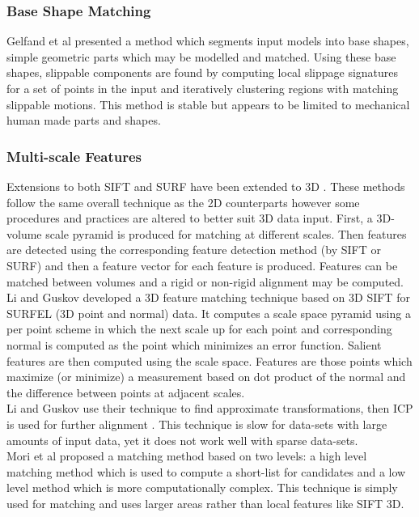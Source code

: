 \subsubsection{Base Shape Matching}

Gelfand et al \cite{Gelfand04Shape} presented a method which segments input models into base shapes, simple geometric parts which may be modelled and matched. Using these base shapes, slippable components are found by computing local slippage signatures for a set of points in the input and iteratively clustering regions with matching slippable motions. This method is stable but appears to be limited to mechanical human made parts and shapes.

\subsubsection{Multi-scale Features}

Extensions to both SIFT and SURF have been extended to 3D \cite{Scovanner073Dimensional,Flitton10Object}. These methods follow the same overall technique as the 2D counterparts however some procedures and practices are altered to better suit 3D data input. First, a 3D-volume scale pyramid is produced for matching at different scales. Then features are detected using the corresponding feature detection method (by SIFT or SURF) and then a feature vector for each feature is produced. Features can be matched between volumes and a rigid or non-rigid alignment may be computed. \\

Li and Guskov \cite{Li05Multiscale} developed a 3D feature matching technique based on 3D SIFT for SURFEL (3D point and normal) data. It computes a scale space pyramid using a per point scheme in which the next scale up for each point and corresponding normal is computed as the point which minimizes an error function. Salient features are then computed using the scale space. Features are those points which maximize (or minimize) a measurement based on dot product of the normal and the difference between points at adjacent scales. \\

Li and Guskov use their technique to find approximate transformations, then ICP is used for further alignment \cite{Besl92Method,Chen92Object}. This technique is slow for data-sets with large amounts of input data, yet it does not work well with sparse data-sets. \\

	
Mori et al \cite{Mori05Efficient} proposed a matching method based on two levels: a high level matching method which is used to compute a short-list for candidates and a low level method which is more computationally complex. This technique is simply used for matching and uses larger areas rather than local features like SIFT 3D. \\

